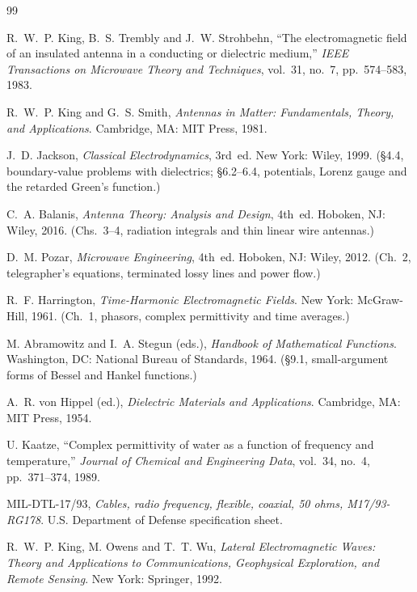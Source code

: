 \documentclass[11pt,a4paper]{article}
\begin{document}
\begin{thebibliography}{99}

R.~W.~P. King, B.~S. Trembly and J.~W. Strohbehn,
``The electromagnetic field of an insulated antenna in a conducting or dielectric medium,''
\emph{IEEE Transactions on Microwave Theory and Techniques}, vol.~31, no.~7, pp.~574--583, 1983.

R.~W.~P. King and G.~S. Smith,
\emph{Antennas in Matter: Fundamentals, Theory, and Applications}.
Cambridge, MA: MIT Press, 1981.

J.~D. Jackson, \emph{Classical Electrodynamics}, 3rd~ed. New York: Wiley, 1999.
(\S4.4, boundary-value problems with dielectrics; \S6.2--6.4, potentials, Lorenz gauge and the retarded
Green's function.)

C.~A. Balanis, \emph{Antenna Theory: Analysis and Design}, 4th~ed. Hoboken, NJ: Wiley, 2016.
(Chs.~3--4, radiation integrals and thin linear wire antennas.)

D.~M. Pozar, \emph{Microwave Engineering}, 4th~ed. Hoboken, NJ: Wiley, 2012.
(Ch.~2, telegrapher's equations, terminated lossy lines and power flow.)

R.~F. Harrington, \emph{Time-Harmonic Electromagnetic Fields}. New York: McGraw-Hill, 1961.
(Ch.~1, phasors, complex permittivity and time averages.)

M. Abramowitz and I.~A. Stegun (eds.), \emph{Handbook of Mathematical Functions}. Washington, DC: National
Bureau of Standards, 1964. (\S9.1, small-argument forms of Bessel and Hankel functions.)

A.~R. von Hippel (ed.), \emph{Dielectric Materials and Applications}. Cambridge, MA: MIT Press, 1954.

U. Kaatze, ``Complex permittivity of water as a function of frequency and temperature,''
\emph{Journal of Chemical and Engineering Data}, vol.~34, no.~4, pp.~371--374, 1989.

MIL-DTL-17/93, \emph{Cables, radio frequency, flexible, coaxial, 50 ohms, M17/93-RG178}.
U.S. Department of Defense specification sheet.

R.~W.~P. King, M. Owens and T.~T. Wu,
\emph{Lateral Electromagnetic Waves: Theory and Applications to Communications, Geophysical Exploration,
and Remote Sensing}. New York: Springer, 1992.

\end{thebibliography}
\end{document}
